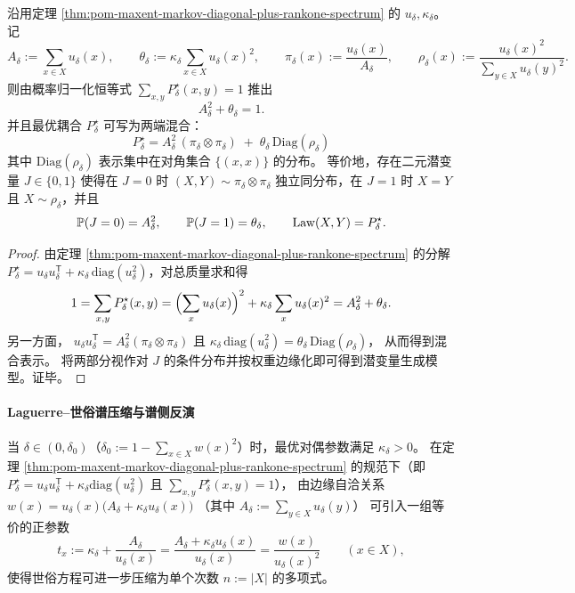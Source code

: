 \begin{corollary}[最优耦合的二元潜变量表示]\label{cor:pom-maxent-markov-optimal-coupling-latent-binary-mixture}
沿用定理 \ref{thm:pom-maxent-markov-diagonal-plus-rankone-spectrum} 的 \(u_\delta,\kappa_\delta\)。
记
\[
A_\delta:=\sum_{x\in X}u_\delta(x),
\qquad
\theta_\delta:=\kappa_\delta\sum_{x\in X}u_\delta(x)^2,
\qquad
\pi_\delta(x):=\frac{u_\delta(x)}{A_\delta},
\qquad
\rho_\delta(x):=\frac{u_\delta(x)^2}{\sum_{y\in X}u_\delta(y)^2}.
\]
则由概率归一化恒等式 \(\sum_{x,y}P^\star_\delta(x,y)=1\) 推出
\[
A_\delta^2+\theta_\delta=1.
\]
并且最优耦合 \(P^\star_\delta\) 可写为两端混合：
\[
\boxed{\;
P^\star_\delta
=A_\delta^2\,(\pi_\delta\otimes\pi_\delta)
\;+\;\theta_\delta\,\mathrm{Diag}(\rho_\delta)\;}
\]
其中 \(\mathrm{Diag}(\rho_\delta)\) 表示集中在对角集合 \(\{(x,x)\}\) 的分布。
等价地，存在二元潜变量 \(J\in\{0,1\}\) 使得在 \(J=0\) 时 \((X,Y)\sim\pi_\delta\otimes\pi_\delta\) 独立同分布，在 \(J=1\) 时 \(X=Y\) 且 \(X\sim\rho_\delta\)，并且
\[
\mathbb P(J=0)=A_\delta^2,\qquad \mathbb P(J=1)=\theta_\delta,
\qquad
{\rm Law}(X,Y)=P^\star_\delta.
\]
\end{corollary}
\begin{proof}
由定理 \ref{thm:pom-maxent-markov-diagonal-plus-rankone-spectrum} 的分解 \(P^\star_\delta=u_\delta u_\delta^{\mathsf T}+\kappa_\delta\,\mathrm{diag}(u_\delta^2)\)，对总质量求和得
\[
1=\sum_{x,y}P^\star_\delta(x,y)=\Bigl(\sum_x u_\delta(x)\Bigr)^2+\kappa_\delta\sum_x u_\delta(x)^2=A_\delta^2+\theta_\delta.
\]
另一方面，
\(
u_\delta u_\delta^{\mathsf T}=A_\delta^2(\pi_\delta\otimes\pi_\delta)
\)
且
\(
\kappa_\delta\,\mathrm{diag}(u_\delta^2)=\theta_\delta\,\mathrm{Diag}(\rho_\delta)
\)，
从而得到混合表示。
将两部分视作对 \(J\) 的条件分布并按权重边缘化即可得到潜变量生成模型。证毕。
\end{proof}

\paragraph{Laguerre--世俗谱压缩与谱侧反演}
当 \(\delta\in(0,\delta_0)\)（\(\delta_0:=1-\sum_{x\in X}w(x)^2\)）时，最优对偶参数满足 \(\kappa_\delta>0\)。
在定理 \ref{thm:pom-maxent-markov-diagonal-plus-rankone-spectrum} 的规范下（即 \(P^\star_\delta=u_\delta u_\delta^{\mathsf T}+\kappa_\delta\mathrm{diag}(u_\delta^2)\) 且 \(\sum_{x,y}P^\star_\delta(x,y)=1\)），
由边缘自洽关系
\(
w(x)=u_\delta(x)\bigl(A_\delta+\kappa_\delta u_\delta(x)\bigr)
\)
（其中 \(A_\delta:=\sum_{y\in X}u_\delta(y)\)）
可引入一组等价的正参数
\[
t_x:=\kappa_\delta+\frac{A_\delta}{u_\delta(x)}
=\frac{A_\delta+\kappa_\delta u_\delta(x)}{u_\delta(x)}
=\frac{w(x)}{u_\delta(x)^2}\qquad(x\in X),
\]
使得世俗方程可进一步压缩为单个次数 \(n:=|X|\) 的多项式。

